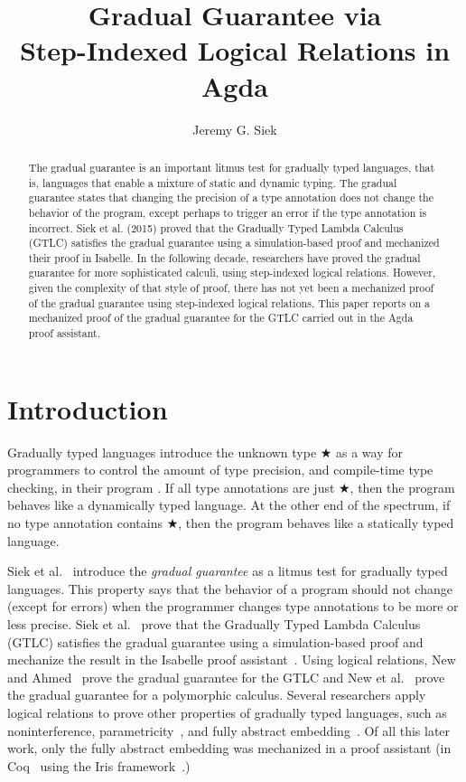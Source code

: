 \documentclass[submission,copyright,creativecommons]{eptcs}
\title{Gradual Guarantee via \\ Step-Indexed Logical Relations in Agda}
\author{Jeremy G. Siek
\institute{School of Informatics, Computing, and Engineering\\
Indiana University \\
Bloomington, IN, USA}
\email{jsiek@iu.edu}
}
\begin{document}
\maketitle

\begin{abstract}
  The gradual guarantee is an important litmus test for gradually
  typed languages, that is, languages that enable a mixture of static
  and dynamic typing. The gradual guarantee states that changing the
  precision of a type annotation does not change the behavior of the
  program, except perhaps to trigger an error if the type annotation
  is incorrect. Siek et al. (2015) proved that the Gradually Typed
  Lambda Calculus (GTLC) satisfies the gradual guarantee using a
  simulation-based proof and mechanized their proof in Isabelle. In
  the following decade, researchers have proved the gradual guarantee
  for more sophisticated calculi, using step-indexed logical
  relations.  However, given the complexity of that style of proof,
  there has not yet been a mechanized proof of the gradual guarantee
  using step-indexed logical relations. This paper reports on a
  mechanized proof of the gradual guarantee for the GTLC carried out
  in the Agda proof assistant.
\end{abstract}

\section{Introduction}

Gradually typed languages introduce the unknown type ★ as a way for
programmers to control the amount of type precision, and compile-time
type checking, in their program \cite{Siek:2006bh,Siek:2007qy}. If all
type annotations are just ★, then the program behaves like a
dynamically typed language. At the other end of the spectrum, if no
type annotation contains ★, then the program behaves like a statically
typed language.

Siek et al.~\cite{Siek:2015ac} introduce the \emph{gradual guarantee}
as a litmus test for gradually typed languages.  This property says
that the behavior of a program should not change (except for errors)
when the programmer changes type annotations to be more or less
precise.  Siek et al.~\cite{Siek:2015ac} prove that the Gradually
Typed Lambda Calculus (GTLC) satisfies the gradual guarantee using a
simulation-based proof and mechanize the result in the Isabelle proof
assistant~\cite{Nipkow:2002jl}. Using logical relations, New and
Ahmed~\cite{New:2018aa} prove the gradual guarantee for the GTLC and
New et al.~\cite{New:2019ab} prove the gradual guarantee for a
polymorphic calculus. Several researchers apply logical relations to
prove other properties of gradually typed languages, such as
noninterference\cite{Toro:2018aa},
parametricity~\cite{Ahmed:2011fk,New:2019ab,Labrada:2020tk}, and fully
abstract embedding~\cite{Jacobs:2021aa}. Of all this later work, only
the fully abstract embedding was mechanized in a proof assistant (in
Coq~\cite{The-Coq-Development-Team:2004kf} using the Iris
framework~\cite{JUNG:2018aa}.)
\end{document}
